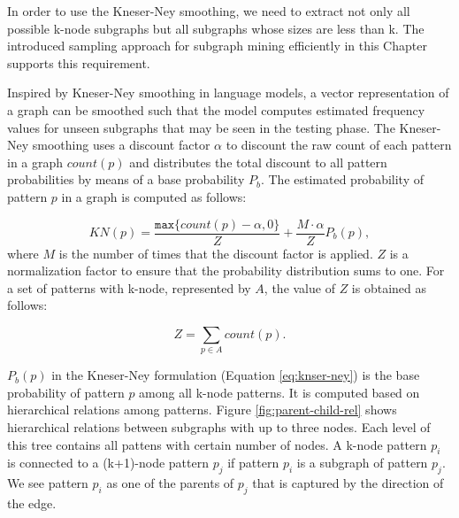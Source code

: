In order to use the Kneser-Ney smoothing, we need to extract not only all possible k-node subgraphs but all subgraphs whose sizes are less than k. 
The introduced sampling approach for subgraph mining efficiently in this Chapter supports this requirement. 

Inspired by \mbox{Kneser-Ney} smoothing in language models, a vector representation of a graph can be smoothed such that the model computes estimated frequency values for unseen subgraphs that may be seen in the testing phase. 
The \mbox{Kneser-Ney} smoothing uses a discount factor $\alpha$ to discount the raw count of each pattern in a graph $count(p)$ and distributes the total discount to all pattern probabilities by means of a base probability $P_b$.
The estimated probability of pattern $p$ in a graph
is computed as follows:

\begin{equation}
  \label{eq:knser-ney}
  KN(p) = \frac{\mathtt{max} \lbrace  count(p)-\alpha, 0 \rbrace }{Z} + \frac{M \cdot \alpha}{Z}P_b(p),
\end{equation}
where $M$ is the number of times that the discount factor is applied. 
$Z$ is a normalization factor to ensure that the probability distribution sums to one.  
For a set of patterns with k-node, represented by $A$, the value of $Z$ is obtained as follows:

\begin{equation}
Z = \sum_{p \in A} count(p). 
\end{equation}

$P_b(p)$ in the \mbox{Kneser-Ney} formulation (Equation \ref{eq:knser-ney}) is the base probability of pattern $p$ among all k-node patterns. 
It is computed based on hierarchical relations among patterns. 
Figure \ref{fig:parent-child-rel} shows hierarchical 
relations between subgraphs with up to three nodes. 
Each level of this tree contains all pattens with certain number of nodes. 
A k-node pattern $p_i$ is connected to a (k+1)-node pattern $p_j$ if pattern $p_i$ is a subgraph of pattern $p_j$. 
We see pattern $p_i$ as one of the parents of $p_j$ that is captured by the direction of the edge. 

